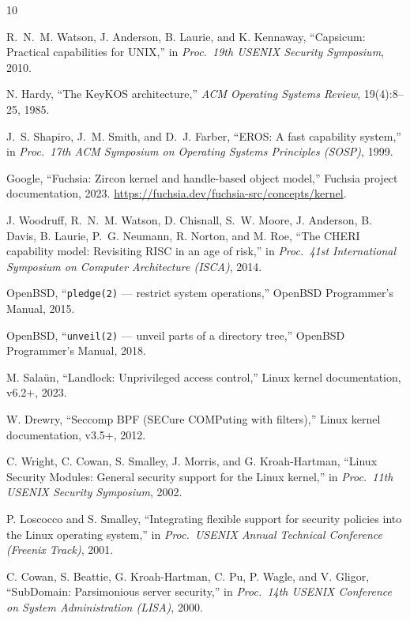 \documentclass[letterpaper,twocolumn,10pt]{article}
\begin{document}
\begin{thebibliography}{10}

R.~N.~M. Watson, J. Anderson, B. Laurie, and K. Kennaway,
``Capsicum: Practical capabilities for UNIX,''
in \emph{Proc.\ 19th USENIX Security Symposium}, 2010.

N. Hardy,
``The KeyKOS architecture,''
\emph{ACM Operating Systems Review}, 19(4):8--25, 1985.

J.~S. Shapiro, J.~M. Smith, and D.~J. Farber,
``EROS: A fast capability system,''
in \emph{Proc.\ 17th ACM Symposium on Operating Systems Principles (SOSP)}, 1999.

Google,
``Fuchsia: Zircon kernel and handle-based object model,''
Fuchsia project documentation, 2023. \url{https://fuchsia.dev/fuchsia-src/concepts/kernel}.

J. Woodruff, R.~N.~M. Watson, D. Chisnall, S.~W. Moore, J. Anderson,
B. Davis, B. Laurie, P.~G. Neumann, R. Norton, and M. Roe,
``The CHERI capability model: Revisiting RISC in an age of risk,''
in \emph{Proc.\ 41st International Symposium on Computer Architecture (ISCA)}, 2014.

OpenBSD,
``\texttt{pledge(2)} --- restrict system operations,''
OpenBSD Programmer's Manual, 2015.

OpenBSD,
``\texttt{unveil(2)} --- unveil parts of a directory tree,''
OpenBSD Programmer's Manual, 2018.

M. Sala\"un,
``Landlock: Unprivileged access control,''
Linux kernel documentation, v6.2+, 2023.

W. Drewry,
``Seccomp BPF (SECure COMPuting with filters),''
Linux kernel documentation, v3.5+, 2012.

C. Wright, C. Cowan, S. Smalley, J. Morris, and G. Kroah-Hartman,
``Linux Security Modules: General security support for the Linux kernel,''
in \emph{Proc.\ 11th USENIX Security Symposium}, 2002.

P. Loscocco and S. Smalley,
``Integrating flexible support for security policies into the Linux operating system,''
in \emph{Proc.\ USENIX Annual Technical Conference (Freenix Track)}, 2001.

C. Cowan, S. Beattie, G. Kroah-Hartman, C. Pu, P. Wagle, and V. Gligor,
``SubDomain: Parsimonious server security,''
in \emph{Proc.\ 14th USENIX Conference on System Administration (LISA)}, 2000.


\end{thebibliography}
\end{document}
